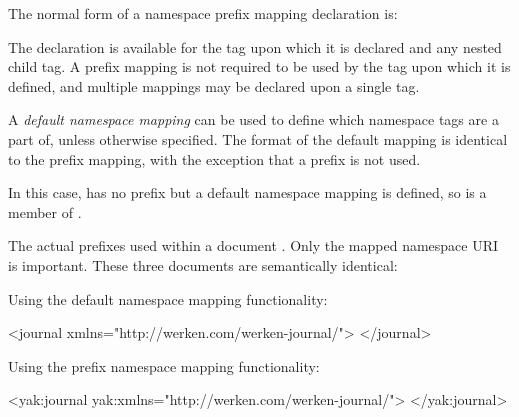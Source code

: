\documentclass[20pt,landscape,headrule,footrule]{foils}
\begin{document}
The normal form of a namespace prefix mapping declaration is:



The declaration is available for the tag upon which it is declared
and any nested child tag.  A prefix mapping is not required to be
used by the tag upon which it is defined, and multiple mappings may
be declared upon a single tag.





A \emph{default namespace mapping} can be used to define which
namespace tags are a part of, unless otherwise specified.  The format
of the default mapping is identical to the prefix mapping, with the
exception that a prefix is not used.



In this case,  has no prefix but a default namespace
mapping is defined, so  is a member of
\texttt{}.



The actual prefixes used within a document .
Only the mapped namespace URI is important.  These three documents
are semantically identical:

Using the default namespace mapping functionality:

\begin{codelisting}
<journal xmlns="http://werken.com/werken-journal/">
</journal>
\end{codelisting}

Using the prefix namespace mapping functionality:

\begin{codelisting}
<yak:journal yak:xmlns="http://werken.com/werken-journal/">
</yak:journal>
\end{codelisting}
\end{document}
